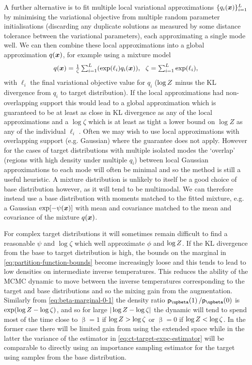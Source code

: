A further alternative is to fit multiple local variational approximations $\lbrace q_i(\boldsymbol{x}) \rbrace_{i=1}^L$ by minimising the variational objective from multiple random parameter initialisations (discarding any duplicate solutions as measured by some distance tolerance between the variational parameters), each approximating a single mode well. We can then combine these local approximations into a global approximation $q(\boldsymbol{x})$, for example using a mixture model
\begin{equation}\label{eq:variational-mixture-approx}\textstyle
  q(\vct{x}) = \frac{1}{\zeta} \sum_{i=1}^L \lpa \exp(\ell_i) q_i(\vct{x}) \rpa,~~
  \zeta = \sum_{i=1}^L \exp(\ell_i),
\end{equation}
with $\ell_i$ the final variational objective value for $q_i$ ($\log Z$ minus the KL divergence from $q_i$ to target distribution). If the local approximations had non-overlapping support this would lead to a global approximation which is guaranteed to be at least as close in \ac{KL} divergence as any of the local approximations and a $\log \zeta$ which is at least as tight a lower bound on $\log Z$ as any of the individual $\ell_i$ \citep{zobay2009mean}. Often we may wish to use local approximations with overlapping support (e.g. Gaussian) where the guarantee does not apply. However for the cases of target distributions with multiple isolated modes the `overlap' (regions with high density under multiple $q_i$) between local Gaussian approximations to each mode will often be minimal and so the method is still a useful heuristic. A mixture distribution is unlikely to itself be a good choice of base distribution however, as it will tend to be multimodal. We can therefore instead use a base distribution with moments matched to the fitted mixture, e.g. a Gaussian $\exp[-\psi(\boldsymbol{x})]$ with mean and covariance matched to the mean and covariance of the mixture $q(\boldsymbol{x})$.

For complex target distributions it will sometimes remain difficult to find a reasonable $\psi$ and $\log \zeta$ which well approximate $\phi$ and $\log Z$. If the \ac{KL} divergence from the base to target distribution is high, the bounds on the marginal in \eqref{eq:partition-function-bounds} become increasingly loose and this tends to lead to low densities on intermediate inverse temperatures. This reduces the ability of the \ac{MCMC} dynamic to move between the inverse temperatures corresponding to the target and base distributions and so the mixing gain from the augmentation. Similarly from \eqref{eq:beta-marginal-0-1} the density ratio $\pden{\upbeta}(1) \,/ \pden{\upbeta}(0)$ is $\exp(\log Z - \log \zeta)$, and so for large $|\log Z - \log\zeta|$ the dynamic will tend to spend most of the time close to $\upbeta = 1$ if $\log Z  > \log \zeta$ or $\upbeta = 0$ if $\log Z < \log \zeta$. In the former case there will be limited gain from using the extended space while in the latter the variance of the estimator in \eqref{eq:ct-target-expc-estimator} will be comparable to directly using an importance sampling estimator for the target using samples from the base distribution.

